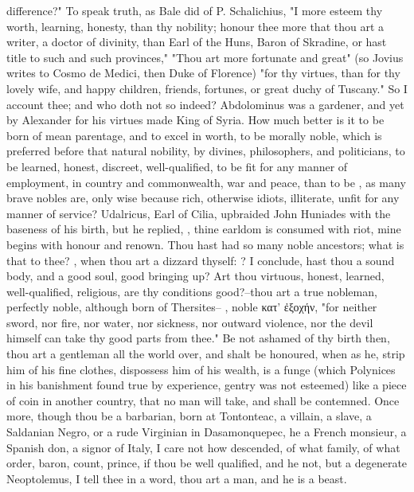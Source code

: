 {difference?" To speak truth, as Bale did of P. Schalichius, "I more esteem thy worth, learning, honesty, than thy nobility; honour thee more that thou art a writer, a doctor of divinity, than Earl of the Huns, Baron of Skradine, or hast title to such and such provinces," \etc{} "Thou art more fortunate and great" (so Jovius writes to Cosmo de Medici, then Duke of Florence) "for thy virtues, than for thy lovely wife, and happy children, friends, fortunes, or great duchy of Tuscany." So I account thee; and who doth not so indeed? Abdolominus was a gardener, and yet by Alexander for his virtues made King of Syria. How much better is it to be born of mean parentage, and to excel in worth, to be morally noble, which is preferred before that natural nobility, by divines, philosophers, and politicians, to be learned, honest, discreet, well-qualified, to be fit for any manner of employment, in country and commonwealth, war and peace, than to be , as many brave nobles are, only wise because rich, otherwise idiots, illiterate, unfit for any manner of service? Udalricus, Earl of Cilia, upbraided John Huniades with the baseness of his birth, but he replied, , thine earldom is consumed with riot, mine begins with honour and renown. Thou hast had so many noble ancestors; what is that to thee? , when thou art a dizzard thyself: ? \etc{} I conclude, hast thou a sound body, and a good soul, good bringing up? Art thou virtuous, honest, learned, well-qualified, religious, are thy conditions good?--thou art a true nobleman, perfectly noble, although born of Thersites-- , noble \textgreek[variant=ancient]{κατ' ἐξοχήν}, "for neither sword, nor fire, nor water, nor sickness, nor outward violence, nor the devil himself can take thy good parts from thee." Be not ashamed of thy birth then, thou art a gentleman all the world over, and shalt be honoured, when as he, strip him of his fine clothes, dispossess him of his wealth, is a funge (which Polynices in his banishment found true by experience, gentry was not esteemed) like a piece of coin in another country, that no man will take, and shall be contemned. Once more, though thou be a barbarian, born at Tontonteac, a villain, a slave, a Saldanian Negro, or a rude Virginian in Dasamonquepec, he a French monsieur, a Spanish don, a signor of Italy, I care not how descended, of what family, of what order, baron, count, prince, if thou be well qualified, and he not, but a degenerate Neoptolemus, I tell thee in a word, thou art a man, and he is a beast.

}
